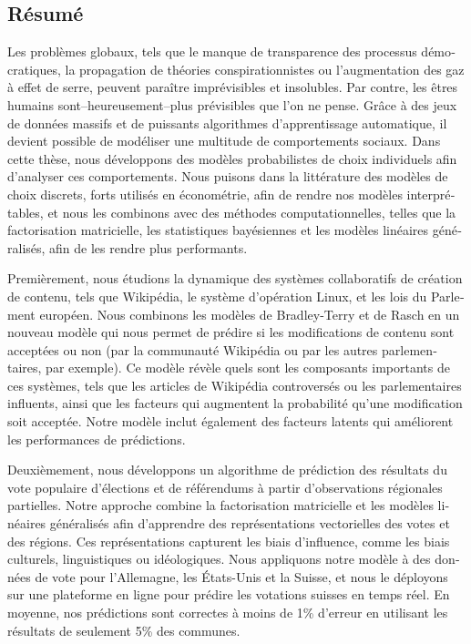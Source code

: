 \begin{otherlanguage}{french}
	\chapter*{Résumé}

	Les problèmes globaux, tels que le manque de transparence des processus démocratiques, la propagation de théories conspirationnistes ou l'augmentation des gaz à effet de serre, peuvent paraître imprévisibles et insolubles.
	Par contre, les êtres humains sont--heureusement--plus prévisibles que l'on ne pense.
	Grâce à des jeux de données massifs et de puissants algorithmes d'apprentissage automatique, il devient possible de modéliser une multitude de comportements sociaux.
	Dans cette thèse, nous développons des modèles probabilistes de choix individuels afin d'analyser ces comportements.
	Nous puisons dans la littérature des modèles de choix discrets, forts utilisés en économétrie, afin de rendre nos modèles interprétables, et nous les combinons avec des méthodes computationnelles, telles que la factorisation matricielle, les statistiques bayésiennes et les modèles linéaires généralisés, afin de les rendre plus performants.

	Premièrement, nous étudions la dynamique des systèmes collaboratifs de création de contenu, tels que Wikipédia, le système d'opération Linux, et les lois du Parlement européen.
	Nous combinons les modèles de Bradley-Terry et de Rasch en un nouveau modèle qui nous permet de prédire si les modifications de contenu sont acceptées ou non (par la communauté Wikipédia ou par les autres parlementaires, par exemple).
	Ce modèle révèle quels sont les composants importants de ces systèmes, tels que les articles de Wikipédia controversés ou les parlementaires influents, ainsi que les facteurs qui augmentent la probabilité qu'une modification soit acceptée.
	Notre modèle inclut également des facteurs latents qui améliorent les performances de prédictions.

	Deuxièmement, nous développons un algorithme de prédiction des résultats du vote populaire d'élections et de référendums à partir d'observations régionales partielles.
	Notre approche combine la factorisation matricielle et les modèles linéaires généralisés afin d'apprendre des représentations vectorielles des votes et des régions.
	Ces représentations capturent les biais d'influence, comme les biais culturels, linguistiques ou idéologiques.
	Nous appliquons notre modèle à des données de vote pour l'Allemagne, les États-Unis et la Suisse, et nous le déployons sur une plateforme en ligne pour prédire les votations suisses en temps réel.
	En moyenne, nos prédictions sont correctes à moins de 1\% d'erreur en utilisant les résultats de seulement 5\% des communes.


\end{otherlanguage}
